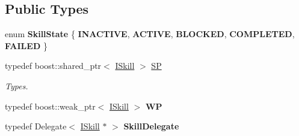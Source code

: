 \subsection*{Public Types}
\begin{DoxyCompactItemize}
\item 
\mbox{\label{class_i_skill_a30ab644adc7e0e8de9599e8e5b3c0f65}} 
enum {\bfseries Skill\+State} \{ \newline
{\bfseries I\+N\+A\+C\+T\+I\+VE}, 
{\bfseries A\+C\+T\+I\+VE}, 
{\bfseries B\+L\+O\+C\+K\+ED}, 
{\bfseries C\+O\+M\+P\+L\+E\+T\+ED}, 
\newline
{\bfseries F\+A\+I\+L\+ED}
 \}
\item 
\mbox{\label{class_i_skill_a68bcce999ab0444eebaca3fb8ddb8a31}} 
typedef boost\+::shared\+\_\+ptr$<$ \hyperlink{class_i_skill}{I\+Skill} $>$ \hyperlink{class_i_skill_a68bcce999ab0444eebaca3fb8ddb8a31}{SP}
\begin{DoxyCompactList}\small\item\em Types. \end{DoxyCompactList}\item 
\mbox{\label{class_i_skill_a1bd624d8493f2fbacfd200205a89cb3a}} 
typedef boost\+::weak\+\_\+ptr$<$ \hyperlink{class_i_skill}{I\+Skill} $>$ {\bfseries WP}
\item 
\mbox{\label{class_i_skill_ae25de8350481bba4c44c78371f0de450}} 
typedef Delegate$<$ \hyperlink{class_i_skill}{I\+Skill} $\ast$ $>$ {\bfseries Skill\+Delegate}
\end{DoxyCompactItemize}
